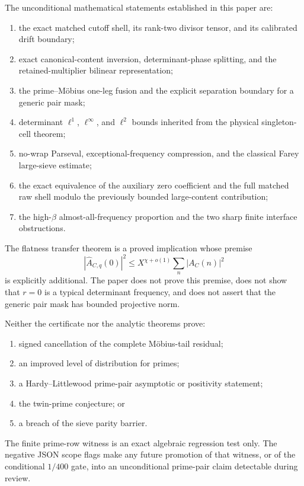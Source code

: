 The unconditional mathematical statements established in this paper are:
\begin{enumerate}[label=\textup{(\roman*)}]
 \item the exact matched cutoff shell, its rank-two divisor tensor, and its
 calibrated drift boundary;
 \item exact canonical-content inversion, determinant-phase splitting, and
 the retained-multiplier bilinear representation;
 \item the prime--M\"obius one-leg fusion and the explicit separation
 boundary for a generic pair mask;
 \item determinant \(\ell^1\), \(\ell^\infty\), and \(\ell^2\) bounds
 inherited from the physical singleton-cell theorem;
 \item no-wrap Parseval, exceptional-frequency compression, and the
 classical Farey large-sieve estimate;
 \item the exact equivalence of the auxiliary zero coefficient and the full
 matched raw shell modulo the previously bounded large-content contribution;
 \item the high-\(\beta\) almost-all-frequency proportion and the two sharp
 finite interface obstructions.
\end{enumerate}
The flatness transfer theorem is a proved implication whose premise
\[
 |\widehat A_{C,q}(0)|^2
 \le X^{\chi+o(1)}\sum_n|A_C(n)|^2
\]
is explicitly additional.  The paper does not prove this premise, does not
show that \(r=0\) is a typical determinant frequency, and does not assert
that the generic pair mask has bounded projective norm.

Neither the certificate nor the analytic theorems prove:
\begin{enumerate}[label=\textup{(\roman*)}]
 \item signed cancellation of the complete M\"obius-tail residual;
 \item an improved level of distribution for primes;
 \item a Hardy--Littlewood prime-pair asymptotic or positivity statement;
 \item the twin-prime conjecture; or
 \item a breach of the sieve parity barrier.
\end{enumerate}
The finite prime-row witness is an exact algebraic regression test only.
The negative JSON scope flags make any future promotion of that witness, or
of the conditional \(1/400\) gate, into an unconditional prime-pair claim
detectable during review.
